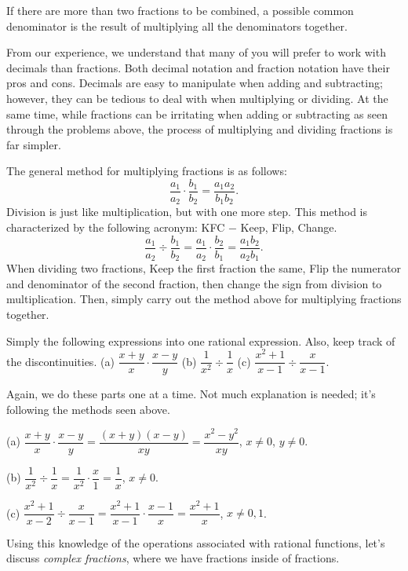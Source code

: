 \documentclass[../book.tex]{subfiles}
\begin{document}
\begin{remark}
If there are more than two fractions to be combined, a possible common denominator is the result of multiplying all the denominators together.
\end{remark}
From our experience, we understand that many of you will prefer to work with decimals than fractions. Both decimal notation and fraction notation have their pros and cons. Decimals are easy to manipulate when adding and subtracting; however, they can be tedious to deal with when multiplying or dividing. At the same time, while fractions can be irritating when adding or subtracting as seen through the problems above, the process of multiplying and dividing fractions is far simpler.

The general method for multiplying fractions is as follows: $$\dfrac{a_1}{a_2}\cdot\dfrac{b_1}{b_2}=\dfrac{a_1a_2}{b_1b_2}.$$
Division is just like multiplication, but with one more step. This method is characterized by the following acronym: KFC $-$ Keep, Flip, Change. $$\dfrac{a_1}{a_2}\div\dfrac{b_1}{b_2}=\dfrac{a_1}{a_2}\cdot\dfrac{b_2}{b_1}=\dfrac{a_1b_2}{a_2b_1}.$$
When dividing two fractions, Keep the first fraction the same, Flip the numerator and denominator of the second fraction, then change the sign from division to multiplication. Then, simply carry out the method above for multiplying fractions together.
\begin{example}
Simply the following expressions into one rational expression. Also, keep track of the discontinuities.\newline
(a) $\dfrac{x+y}{x}\cdot \dfrac{x-y}{y}$  (b) $\dfrac{1}{x^2}\div\dfrac{1}{x}$  (c) $\dfrac{x^2+1}{x-1}\div\dfrac{x}{x-1}$.
\end{example}
\begin{solution}
Again, we do these parts one at a time.  Not much explanation is needed; it's following the methods seen above.

(a) $\dfrac{x+y}{x}\cdot\dfrac{x-y}{y}=\dfrac{(x+y)(x-y)}{xy}=\dfrac{x^2-y^2}{xy}$, $x\neq 0$, $y\neq 0$.

(b) $\dfrac{1}{x^2}\div\dfrac{1}{x}=\dfrac{1}{x^2}\cdot\dfrac{x}{1}=\dfrac{1}{x}$, $x\neq 0$.

(c) $\dfrac{x^2+1}{x-2}\div\dfrac{x}{x-1}=\dfrac{x^2+1}{x-1}\cdot\dfrac{x-1}{x}=\dfrac{x^2+1}{x}$, $x\neq 0,1$.
\end{solution}
Using this knowledge of the operations associated with rational functions, let's discuss \textit{complex fractions}, where we have fractions inside of fractions.
\end{document}
